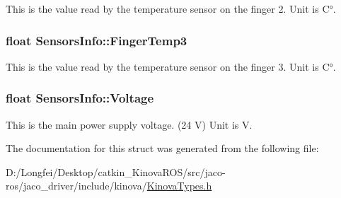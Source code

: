 This is the value read by the temperature sensor on the finger 2. Unit is C°. 

\subsubsection[{\texorpdfstring{Finger\+Temp3}{FingerTemp3}}]{\setlength{\rightskip}{0pt plus 5cm}float Sensors\+Info\+::\+Finger\+Temp3}\hypertarget{structSensorsInfo_ad18fa2c352189db0a8aff1d38c1c7b52}{}\label{structSensorsInfo_ad18fa2c352189db0a8aff1d38c1c7b52}


This is the value read by the temperature sensor on the finger 3. Unit is C°. 

\subsubsection[{\texorpdfstring{Voltage}{Voltage}}]{\setlength{\rightskip}{0pt plus 5cm}float Sensors\+Info\+::\+Voltage}\hypertarget{structSensorsInfo_a9ced23ff499026d028b2179945091775}{}\label{structSensorsInfo_a9ced23ff499026d028b2179945091775}


This is the main power supply voltage. (24 V) Unit is V. 



The documentation for this struct was generated from the following file\+:\begin{DoxyCompactItemize}
\item 
D\+:/\+Longfei/\+Desktop/catkin\+\_\+\+Kinova\+R\+O\+S/src/jaco-\/ros/jaco\+\_\+driver/include/kinova/\hyperlink{KinovaTypes_8h}{Kinova\+Types.\+h}\end{DoxyCompactItemize}
